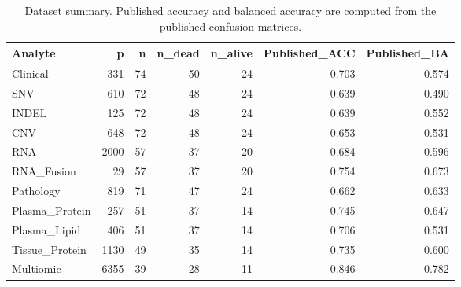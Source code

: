 \begin{table}[t]
\centering
\caption{Dataset summary. Published accuracy and balanced accuracy are computed from the published confusion matrices.}
\begin{tabular}{lrrrrrr}
\hline
Analyte & p & n & n\_dead & n\_alive & Published\_ACC & Published\_BA \\
\hline
Clinical & 331 & 74 & 50 & 24 & 0.703 & 0.574 \\
SNV & 610 & 72 & 48 & 24 & 0.639 & 0.490 \\
INDEL & 125 & 72 & 48 & 24 & 0.639 & 0.552 \\
CNV & 648 & 72 & 48 & 24 & 0.653 & 0.531 \\
RNA & 2000 & 57 & 37 & 20 & 0.684 & 0.596 \\
RNA\_Fusion & 29 & 57 & 37 & 20 & 0.754 & 0.673 \\
Pathology & 819 & 71 & 47 & 24 & 0.662 & 0.633 \\
Plasma\_Protein & 257 & 51 & 37 & 14 & 0.745 & 0.647 \\
Plasma\_Lipid & 406 & 51 & 37 & 14 & 0.706 & 0.531 \\
Tissue\_Protein & 1130 & 49 & 35 & 14 & 0.735 & 0.600 \\
Multiomic & 6355 & 39 & 28 & 11 & 0.846 & 0.782 \\
\hline
\end{tabular}
\end{table}
